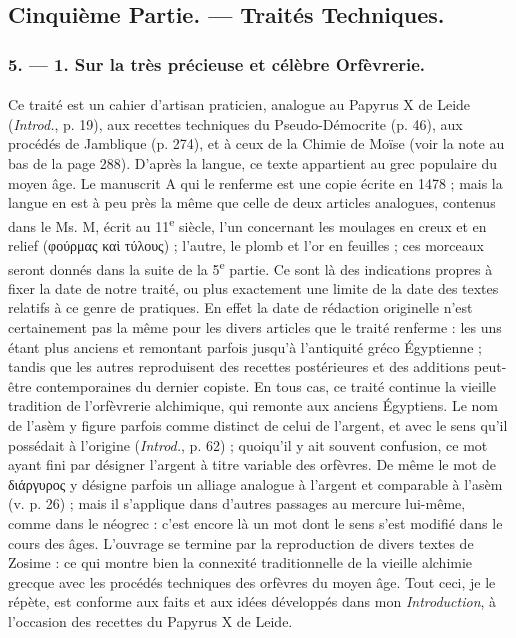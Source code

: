 \documentclass[a4paper, 11pt, oneside, polutonikogreek, french]{article}
\begin{document}
\bigskip
\centerline{\EightStarTaper}
\centerline{\EightStarTaper\EightStarTaper}
\bigskip
\clearpage
\subsection{Cinquième Partie. --- Traités Techniques.}
\subsubsection{5. --- 1. Sur la très précieuse et célèbre Orfèvrerie.}
\paragraph{}
Ce traité est un cahier d'artisan praticien, analogue au Papyrus X de Leide (\emph{Introd.}, p. 19), aux recettes techniques du Pseudo-Démocrite (p. 46), aux procédés de Jamblique (p. 274), et à ceux de la Chimie de Moïse (voir la note au bas de la page 288). D'après la langue, ce texte appartient au grec populaire du moyen âge. Le manuscrit A qui le renferme est une copie écrite en 1478 ; mais la langue en est à peu près la même que celle de deux articles analogues, contenus dans le Ms. M, écrit au 11\textsuperscript{e} siècle, l'un concernant les moulages en creux et en relief (φούρμας καὶ τύλους) ; l'autre, le plomb et l'or en feuilles ; ces morceaux seront donnés dans la suite de la 5\textsuperscript{e} partie. Ce sont là des indications propres à fixer la date de notre traité, ou plus exactement une limite de la date des textes relatifs à ce genre de pratiques. En effet la date de rédaction originelle n'est certainement pas la même pour les divers articles que le traité renferme : les uns étant plus anciens et remontant parfois jusqu'à l'antiquité gréco Égyptienne ; tandis que les autres reproduisent des recettes postérieures et des additions peut-être contemporaines du dernier copiste. En tous cas, ce traité continue la vieille tradition de l'orfèvrerie alchimique, qui remonte aux anciens Égyptiens. Le nom de l'asèm y figure parfois comme distinct de celui de l'argent, et avec le sens qu'il possédait à l'origine (\emph{Introd.}, p. 62) ; quoiqu'il y ait souvent confusion, ce mot ayant fini par désigner l'argent à titre variable des orfèvres. De même le mot de διάργυρος y désigne parfois un alliage analogue à l'argent et comparable à l'asèm (v. p. 26) ; mais il s'applique dans d'autres passages au mercure lui-même, comme dans le néogrec : c'est encore là un mot dont le sens s'est modifié dans le cours des âges. L'ouvrage se termine par la reproduction de divers textes de Zosime : ce qui montre bien la connexité traditionnelle de la vieille alchimie grecque avec les procédés techniques des orfèvres du moyen âge. Tout ceci, je le répète, est conforme aux faits et aux idées développés dans mon \emph{Introduction}, à l'occasion des recettes du Papyrus X de Leide.
\end{document}
